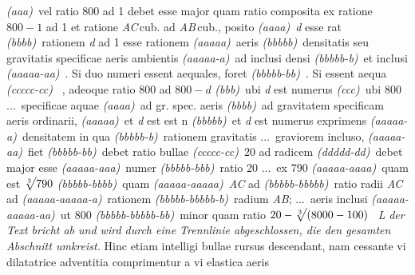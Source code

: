 {{\textit{(aaa)}~vel ratio 800 ad 1 debet esse major quam ratio composita ex ratione $800 - 1$ ad 1 et ratione \textit{AC}\,cub. ad \textit{AB}\,cub., posito %
\textit{(aaaa)}~\textit{d} esse rat %
\textit{(bbbb)}~rationem \textit{d} ad 1 esse rationem %
\textit{(aaaaa)}~aeris %
\textit{(bbbbb)}~densitatis seu gravitatis specificae aeris ambientis %
\textit{(aaaaa-a)}~ad inclusi densi %
\textit{(bbbbb-b)}~et inclusi %
\textit{(aaaaa-aa)}~. Si duo numeri essent aequales, foret %
\textit{(bbbbb-bb)}~. Si essent aequa %
\textit{(ccccc-cc)}~%
, adeoque ratio 800 ad $800 - d$
\textit{(bbb)}~ubi \textit{d} est numerus %
\textit{(ccc)}~ubi 800 %
\lbrack...\rbrack\ specificae aquae %
\textit{(aaaa)}~ad gr. spec. aeris %
\textit{(bbbb)}~ad gravitatem specificam aeris ordinarii, %
\textit{(aaaaa)}~et \textit{d} est est n %
\textit{(bbbbb)}~et \textit{d} est numerus exprimens %
\textit{(aaaaa-a)}~densitatem in qua %
\textit{(bbbbb-b)}~rationem gravitatis %
\lbrack...\rbrack\ graviorem incluso, %
\textit{(aaaaa-aa)}~fiet %
\textit{(bbbbb-bb)}~debet ratio bullae %
\textit{(ccccc-cc)}~20 ad radicem
\textit{(ddddd-dd)}~debet major esse %
\textit{(aaaaa-aaa)}~numer %
\textit{(bbbbb-bbb)}~ratio 20 %
\lbrack...\rbrack\ ex 790 %
\textit{(aaaaa-aaaa)}~quam est $\displaystyle\sqrt[3]{\vphantom{j}}790$
\textit{(bbbbb-bbbb)}~quam %
\textit{(aaaaa-aaaaa)}~\textit{AC} ad %
\textit{(bbbbb-bbbbb)}~ratio radii \textit{AC} ad %
\textit{(aaaaa-aaaaa-a)}~rationem %
\textit{(bbbbb-bbbbb-b)}~radium \textit{AB}; %
\lbrack...\rbrack\ aeris inclusi %
\textit{(aaaaa-aaaaa-aa)}~ut 800 %
\textit{(bbbbb-bbbbb-bb)}~minor quam ratio $\displaystyle20 - \sqrt[3]{\vphantom{j}}(8000 - 100)$%
~\textit{L}%
}}
\lbrack%
\textit{der Text bricht ab und wird durch eine Trennlinie abgeschlossen,
die den gesamten Abschnitt  umkreist.}%
\rbrack%
\pend%
\pstart%
Hinc etiam intelligi%
bullae rursus descendant,%
%
%
nam cessante vi dilatatrice%
%
adventitia %
comprimentur a vi elastica aeris%
%
